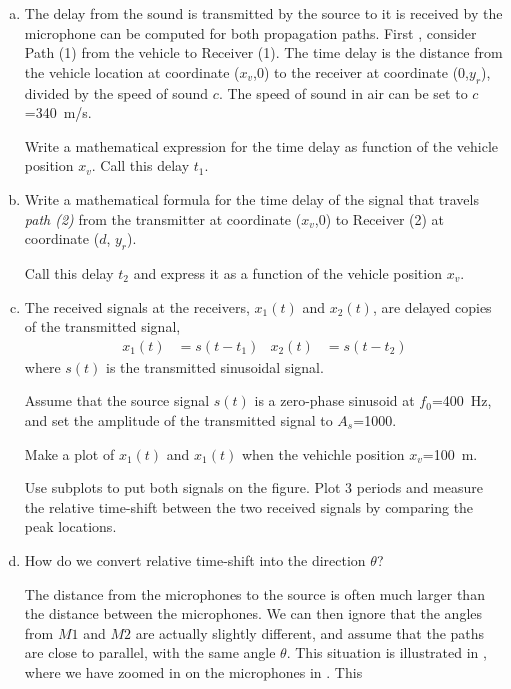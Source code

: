 \begin{enumerate}[a)]
	\item The delay from the sound is transmitted by the source to it is received by the microphone can be computed for both propagation paths. First , consider Path (1) from the vehicle to Receiver (1). The time delay is the distance from the vehicle location at coordinate ($x_v$,0) to the
	receiver at coordinate (0,$y_r$), divided by the speed of sound $c$.
	The speed of sound in air can be set to $c$=\qty{340}{m/s}. 
	
	Write a mathematical expression for the time delay as function of the vehicle position $x_v$. 
		Call this delay $t_1$.
		
	\item Write a mathematical formula for the time delay of the signal that travels \emph{path (2)} from the transmitter at coordinate ($x_v$,0) to Receiver (2) at coordinate ($d$, $y_r$).
	
	Call this delay $t_2$ and express it as a function of the vehicle position $x_v$.
	
	\item The received signals at the receivers, $x_1(t)$ and $x_2(t)$,  are delayed copies of the transmitted signal,
	\begin{align*}
		x_1(t)&= s(t-t_1)  &	x_2(t)&= s(t-t_2)  
	\end{align*}
	where $s(t)$ is the transmitted sinusoidal signal.
	
	Assume that the source signal $s(t)$ is a zero-phase sinusoid at $f_0$=\qty{400}{Hz}, and set the amplitude of the transmitted signal to $A_s$=\num{1000}. 
	
	Make a plot of $x_1(t)$ and $x_1(t)$ when the vehichle position $x_v$=\qty{100}{m}.
	
	Use subplots to put both signals on the figure. 
	Plot 3 periods and measure the relative time-shift between the two received
	signals by comparing the peak locations.
	
	\item How do we convert relative time-shift into the direction $\theta$?
	
	The distance from the microphones to the source is often much larger than the distance between the microphones. We can then ignore that the angles from $M1$ and $M2$ are actually slightly different, and assume that the paths are close to parallel, with the same angle $\theta$. This situation is illustrated in , where we have zoomed in on the microphones in . 
	This
	

\end{enumerate}
